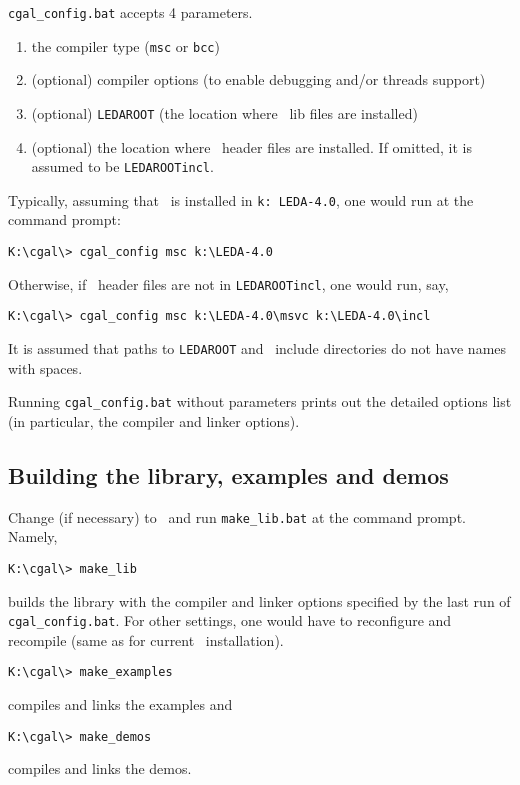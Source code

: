 \texttt{cgal\_config.bat} accepts 4 parameters.
\begin{enumerate}
\item the compiler type (\texttt{msc} or \texttt{bcc})
%
\item (optional) compiler options (to enable debugging and/or threads
                support)
%
\item (optional) \texttt{LEDAROOT} (the location where \leda\ lib files are installed)
%
\item (optional) the location where \leda\ header files are installed.
                If omitted, it is assumed to be 
\texttt{LEDAROOT\bslsh incl}.
\end{enumerate}

Typically, assuming that \leda\ is installed in \texttt{k:\bslsh
  LEDA-4.0}, one would run at the command prompt:
\begin{verbatim}
K:\cgal\> cgal_config msc k:\LEDA-4.0
\end{verbatim}

Otherwise, if \leda\ header files are not in \texttt{LEDAROOT\bslsh incl}, 
one would run, say,

\begin{verbatim}
K:\cgal\> cgal_config msc k:\LEDA-4.0\msvc k:\LEDA-4.0\incl
\end{verbatim}

It is assumed that paths to \texttt{LEDAROOT} and \leda\ include
directories do not have names with spaces.

Running \texttt{cgal\_config.bat} without parameters prints out the detailed
options list (in particular, the compiler and linker options).


\subsection{Building the library, examples and demos}

Change (if necessary)
to \CGALR\ and run \texttt{make\_lib.bat} at the command prompt. Namely,
\begin{verbatim}
K:\cgal\> make_lib
\end{verbatim}

builds the library with the compiler and linker options specified
by the last run of \texttt{cgal\_config.bat}.
For other settings, one would have to reconfigure and recompile
(same as for current \leda\ installation).
\begin{verbatim}
K:\cgal\> make_examples
\end{verbatim}
compiles and links the examples and
\begin{verbatim}
K:\cgal\> make_demos
\end{verbatim}
compiles and links the demos. 

